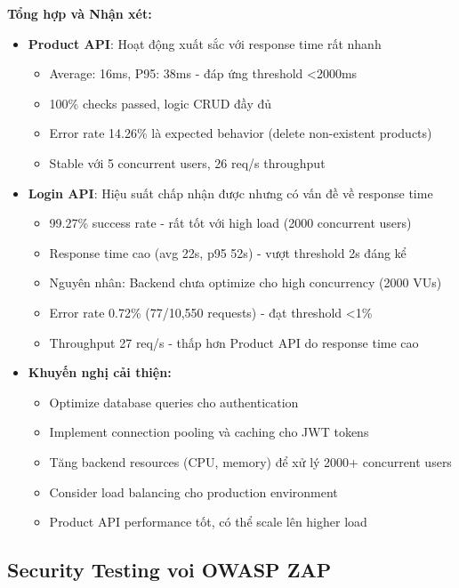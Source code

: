 \textbf{Tổng hợp và Nhận xét:}
\begin{itemize}
    \item \textbf{Product API}: Hoạt động xuất sắc với response time rất nhanh
    \begin{itemize}
        \item Average: 16ms, P95: 38ms - đáp ứng threshold <2000ms
        \item 100\% checks passed, logic CRUD đầy đủ
        \item Error rate 14.26\% là expected behavior (delete non-existent products)
        \item Stable với 5 concurrent users, 26 req/s throughput
    \end{itemize}
    
    \item \textbf{Login API}: Hiệu suất chấp nhận được nhưng có vấn đề về response time
    \begin{itemize}
        \item 99.27\% success rate - rất tốt với high load (2000 concurrent users)
        \item Response time cao (avg 22s, p95 52s) - vượt threshold 2s đáng kể
        \item Nguyên nhân: Backend chưa optimize cho high concurrency (2000 VUs)
        \item Error rate 0.72\% (77/10,550 requests) - đạt threshold <1\%
        \item Throughput 27 req/s - thấp hơn Product API do response time cao
    \end{itemize}
    
    \item \textbf{Khuyến nghị cải thiện:}
    \begin{itemize}
        \item Optimize database queries cho authentication
        \item Implement connection pooling và caching cho JWT tokens
        \item Tăng backend resources (CPU, memory) để xử lý 2000+ concurrent users
        \item Consider load balancing cho production environment
        \item Product API performance tốt, có thể scale lên higher load
    \end{itemize}
\end{itemize}

\subsection{Security Testing voi OWASP ZAP}

